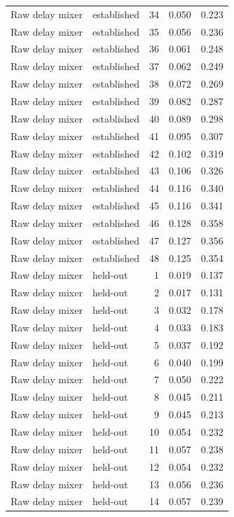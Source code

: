 \begin{tabular}{llrrr}
Raw delay mixer & established & 34 & 0.050 & 0.223 \\
Raw delay mixer & established & 35 & 0.056 & 0.236 \\
Raw delay mixer & established & 36 & 0.061 & 0.248 \\
Raw delay mixer & established & 37 & 0.062 & 0.249 \\
Raw delay mixer & established & 38 & 0.072 & 0.269 \\
Raw delay mixer & established & 39 & 0.082 & 0.287 \\
Raw delay mixer & established & 40 & 0.089 & 0.298 \\
Raw delay mixer & established & 41 & 0.095 & 0.307 \\
Raw delay mixer & established & 42 & 0.102 & 0.319 \\
Raw delay mixer & established & 43 & 0.106 & 0.326 \\
Raw delay mixer & established & 44 & 0.116 & 0.340 \\
Raw delay mixer & established & 45 & 0.116 & 0.341 \\
Raw delay mixer & established & 46 & 0.128 & 0.358 \\
Raw delay mixer & established & 47 & 0.127 & 0.356 \\
Raw delay mixer & established & 48 & 0.125 & 0.354 \\
Raw delay mixer & held-out & 1 & 0.019 & 0.137 \\
Raw delay mixer & held-out & 2 & 0.017 & 0.131 \\
Raw delay mixer & held-out & 3 & 0.032 & 0.178 \\
Raw delay mixer & held-out & 4 & 0.033 & 0.183 \\
Raw delay mixer & held-out & 5 & 0.037 & 0.192 \\
Raw delay mixer & held-out & 6 & 0.040 & 0.199 \\
Raw delay mixer & held-out & 7 & 0.050 & 0.222 \\
Raw delay mixer & held-out & 8 & 0.045 & 0.211 \\
Raw delay mixer & held-out & 9 & 0.045 & 0.213 \\
Raw delay mixer & held-out & 10 & 0.054 & 0.232 \\
Raw delay mixer & held-out & 11 & 0.057 & 0.238 \\
Raw delay mixer & held-out & 12 & 0.054 & 0.232 \\
Raw delay mixer & held-out & 13 & 0.056 & 0.236 \\
Raw delay mixer & held-out & 14 & 0.057 & 0.239 \\

\end{tabular}
